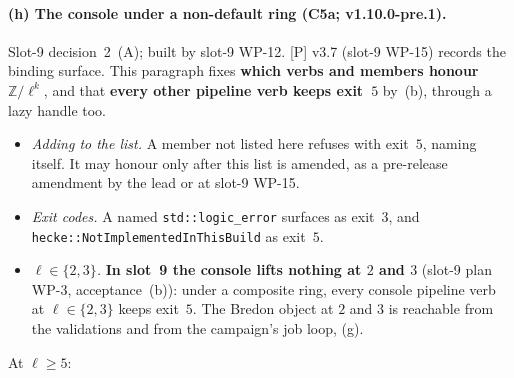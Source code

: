 \documentclass[11pt]{article}
\theoremstyle{remark}
\newcommand{\Z}{\mathbb{Z}}
\begin{document}
\paragraph{(h) The console under a non-default ring (C5a; v1.10.0-pre.1).}
Slot-9 decision~2~(A); built by slot-9 WP-12. [P] v3.7 (slot-9 WP-15) records the binding surface.
This paragraph fixes \textbf{which verbs and members honour $\Z/\ell^k$}, and that
\textbf{every other pipeline verb keeps exit~$5$} by~(b), through a lazy handle too.
\begin{itemize}
\item \emph{Adding to the list.} A member not listed here refuses with exit~$5$, naming itself. It
  may honour only after this list is amended, as a pre-release amendment by the lead or at
  slot-9 WP-15.
\item \emph{Exit codes.} A named \texttt{std::logic\_error} surfaces as exit~$3$, and
  \texttt{hecke::NotImplementedInThisBuild} as exit~$5$.
\item \emph{$\ell\in\{2,3\}$.} \textbf{In slot~9 the console lifts nothing at $2$ and $3$}
  (slot-9 plan WP-3, acceptance~(b)): under a composite ring, every console pipeline verb at
  $\ell\in\{2,3\}$ keeps exit~$5$. The Bredon object at $2$ and $3$ is reachable from the
  validations and from the campaign's job loop, (g).
\end{itemize}
At $\ell\ge5$:
\end{document}
